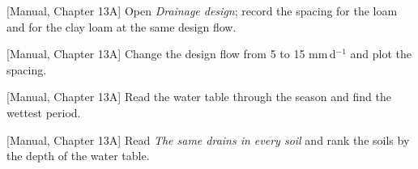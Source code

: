 \begin{exlist}
\item {\color{khblue}[Manual, Chapter 13A]} Open \emph{Drainage design}; record the spacing for the loam and for the clay loam at the same design flow.\par{}
\item {\color{khblue}[Manual, Chapter 13A]} Change the design flow from 5 to 15 mm\,d$^{-1}$ and plot the spacing.\par{}
\item {\color{khblue}[Manual, Chapter 13A]} Read the water table through the season and find the wettest period.\par{}
\item {\color{khblue}[Manual, Chapter 13A]} Read \emph{The same drains in every soil} and rank the soils by the depth of the water table.\par{}
\end{exlist}
